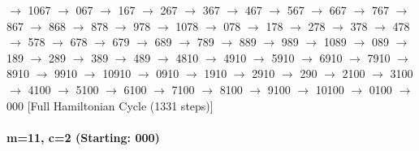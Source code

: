 $\rightarrow$ 1067 $\rightarrow$ 067 $\rightarrow$ 167 $\rightarrow$ 267 $\rightarrow$ 367 $\rightarrow$ 467 $\rightarrow$ 567 $\rightarrow$ 667 $\rightarrow$ 767 $\rightarrow$ 867 $\rightarrow$ 868 $\rightarrow$ 878 $\rightarrow$ 978 $\rightarrow$ 1078 $\rightarrow$ 078 $\rightarrow$ 178 $\rightarrow$ 278 $\rightarrow$ 378 $\rightarrow$ 478 $\rightarrow$ 578 $\rightarrow$ 678 $\rightarrow$ 679 $\rightarrow$ 689 $\rightarrow$ 789 $\rightarrow$ 889 $\rightarrow$ 989 $\rightarrow$ 1089 $\rightarrow$ 089 $\rightarrow$ 189 $\rightarrow$ 289 $\rightarrow$ 389 $\rightarrow$ 489 $\rightarrow$ 4810 $\rightarrow$ 4910 $\rightarrow$ 5910 $\rightarrow$ 6910 $\rightarrow$ 7910 $\rightarrow$ 8910 $\rightarrow$ 9910 $\rightarrow$ 10910 $\rightarrow$ 0910 $\rightarrow$ 1910 $\rightarrow$ 2910 $\rightarrow$ 290 $\rightarrow$ 2100 $\rightarrow$ 3100 $\rightarrow$ 4100 $\rightarrow$ 5100 $\rightarrow$ 6100 $\rightarrow$ 7100 $\rightarrow$ 8100 $\rightarrow$ 9100 $\rightarrow$ 10100 $\rightarrow$ 0100 $\rightarrow$ 000 
[Full Hamiltonian Cycle (1331 steps)]


\paragraph{ m=11, c=2 (Starting: 000)}



